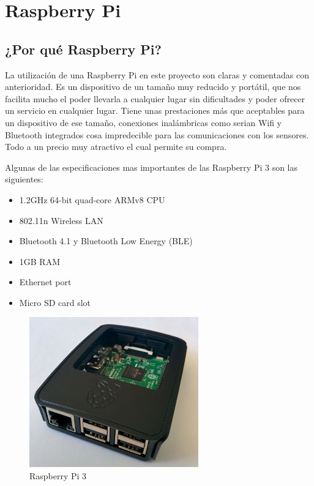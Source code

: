 \chapter{Raspberry Pi}

\section{¿Por qué Raspberry Pi?}

La utilización de una Raspberry Pi en este proyecto son claras y comentadas con anterioridad. 
Es un dispositivo de un tamaño muy reducido y portátil, que nos facilita mucho el poder llevarla a cualquier lugar sin dificultades y poder ofrecer un servicio en cualquier lugar.
Tiene unas prestaciones más que aceptables para un dispositivo de ese tamaño, conexiones inalámbricas como serian Wifi y Bluetooth integrados cosa impredecible para las comunicaciones con los sensores. Todo a un precio muy atractivo el cual permite su compra.  

Algunas de las especificaciones mas importantes de las Raspberry Pi 3 son las siguientes:
\begin{itemize}
\item 1.2GHz 64-bit quad-core ARMv8 CPU
\item 802.11n Wireless LAN
\item Bluetooth 4.1 y Bluetooth Low Energy (BLE)
\item 1GB RAM
\item Ethernet port
\item Micro SD card slot 
\end{itemize}

\begin{figure}[htb]
\begin{center}
\includegraphics[width=0.65\textwidth]{./setup/raspi}
\caption{Raspberry Pi 3}
\label{Inf:Infraestructura}
\end{center}
\end{figure}


